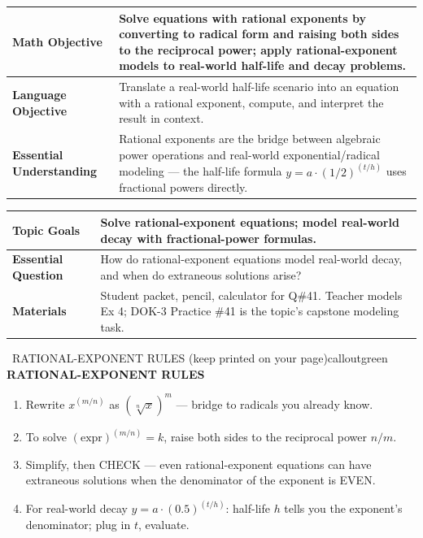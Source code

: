 \documentclass[11pt]{article}
\begin{document}

{\small
\renewcommand{\arraystretch}{1.25}
\noindent\begin{tabular}{|p{1.8in}|p{4.8in}|}
\hline
\textbf{Math Objective} & Solve equations with rational exponents by converting to radical form and raising both sides to the reciprocal power; apply rational-exponent models to real-world half-life and decay problems. \\ \hline
\textbf{Language Objective} & Translate a real-world half-life scenario into an equation with a rational exponent, compute, and interpret the result in context. \\ \hline
\textbf{Essential Understanding} & Rational exponents are the bridge between algebraic power operations and real-world exponential/radical modeling --- the half-life formula \(y = a \cdot (1/2)^{(t/h)}\) uses fractional powers directly. \\ \hline
\end{tabular}
}

{\small
\renewcommand{\arraystretch}{1.25}
\noindent\begin{tabular}{|p{1.8in}|p{4.8in}|}
\hline
\textbf{Topic Goals} & Solve rational-exponent equations; model real-world decay with fractional-power formulas. \\ \hline
\textbf{Essential Question} & How do rational-exponent equations model real-world decay, and when do extraneous solutions arise? \\ \hline
\textbf{Materials} & Student packet, pencil, calculator for Q\#41. Teacher models Ex 4; DOK-3 Practice \#41 is the topic's capstone modeling task. \\ \hline
\end{tabular}
}


\begin{callout}{\IconBook\ RATIONAL-EXPONENT RULES (keep printed on your page)}{calloutgreen}
\textbf{RATIONAL-EXPONENT RULES}
\begin{enumerate}[leftmargin=2.1em,itemsep=1pt,topsep=3pt]
  \item Rewrite \(x^{(m/n)}\) as \((\sqrt[n]{x})^m\) --- bridge to radicals you already know.
  \item To solve \((\text{expr})^{(m/n)} = k\), raise both sides to the reciprocal power \(n/m\).
  \item Simplify, then CHECK --- even rational-exponent equations can have extraneous solutions when the denominator of the exponent is EVEN.
  \item For real-world decay \(y = a \cdot (0.5)^{(t/h)}\): half-life \(h\) tells you the exponent's denominator; plug in \(t\), evaluate.
\end{enumerate}
\end{callout}
\end{document}

